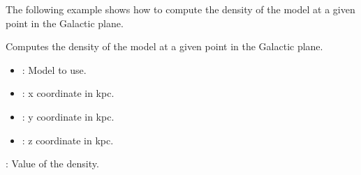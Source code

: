 \documentclass[letterpaper,10pt,english]{sphinxmanual}
\begin{document}
\begin{fulllineitems}
\begin{description}
\sphinxAtStartPar
The following example shows how to compute the density of the model at a given point in the Galactic plane.

\begin{sphinxVerbatim}[commandchars=\\\{\}]
     
\end{sphinxVerbatim}

\end{description}

\begin{fulllineitems}
\label{\detokenize{ModelHelper:ModelHelper.ModelHelper.compute_extinction_model_density}}
\pysigstartsignatures
{}
\pysigstopsignatures
\sphinxAtStartPar
Computes the density of the model at a given point in the Galactic plane.
\begin{description}
\begin{itemize}
\item {} 
\sphinxAtStartPar
{}: Model to use.

\item {} 
\sphinxAtStartPar
{}: x coordinate in kpc.

\item {} 
\sphinxAtStartPar
{}: y coordinate in kpc.

\item {} 
\sphinxAtStartPar
{}: z coordinate in kpc.

\end{itemize}

\sphinxAtStartPar
{} : Value of the density.


\end{description}
\end{fulllineitems}
\end{fulllineitems}
\end{document}
